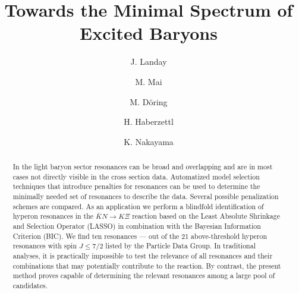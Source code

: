 \documentclass[10pt,aps,prc,superscriptaddress,twoside,twocolumn,nofootinbib,showpacs,preprintnumbers]{revtex4-1}
\begin{document}
\title{Towards the Minimal Spectrum of Excited Baryons}
\author{J. Landay}
\author{M. Mai}
\author{M. D\"oring}
\author{H. Haberzettl}
\author{K. Nakayama}


\begin{abstract}
In the light baryon sector resonances can be broad and overlapping and are in most cases not directly visible in the cross section data. Automatized model selection techniques that introduce penalties for resonances can be used to determine the minimally needed set of resonances to describe the data. Several possible penalization schemes are compared. As an application we perform a blindfold identification of hyperon resonances in the $\bar{K} N \to K \Xi$ reaction based on the Least Absolute Shrinkage and Selection Operator (LASSO) in combination with the Bayesian Information Criterion (BIC). We find ten resonances --- out of the 21 above-threshold hyperon resonances with spin $J\le 7/2$ listed by the Particle Data Group. In traditional analyses, it is practically impossible to test the relevance of all  resonances and their combinations that may potentially contribute to the reaction. By contrast, the present method proves capable of determining the relevant resonances among a large pool of candidates.
\end{abstract}

\maketitle
\end{document}
